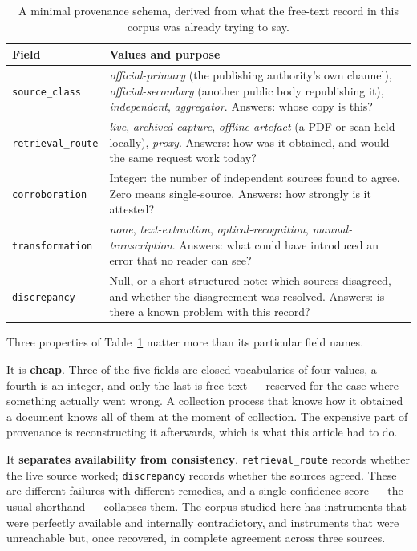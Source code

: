 \documentclass[11pt]{article}
\begin{document}
\begin{table}[t]
\centering
\small
\begin{tabular}{lp{7.4cm}}
\toprule
\textbf{Field} & \textbf{Values and purpose} \\
\midrule
\texttt{source\_class} & \emph{official-primary} (the publishing authority's
own channel), \emph{official-secondary} (another public body republishing it),
\emph{independent}, \emph{aggregator}. Answers: whose copy is this? \\
\addlinespace
\texttt{retrieval\_route} & \emph{live}, \emph{archived-capture},
\emph{offline-artefact} (a PDF or scan held locally), \emph{proxy}. Answers:
how was it obtained, and would the same request work today? \\
\addlinespace
\texttt{corroboration} & Integer: the number of independent sources found to
agree. Zero means single-source. Answers: how strongly is it attested? \\
\addlinespace
\texttt{transformation} & \emph{none}, \emph{text-extraction},
\emph{optical-recognition}, \emph{manual-transcription}. Answers: what could
have introduced an error that no reader can see? \\
\addlinespace
\texttt{discrepancy} & Null, or a short structured note: which sources
disagreed, and whether the disagreement was resolved. Answers: is there a known
problem with this record? \\
\bottomrule
\end{tabular}
\caption{A minimal provenance schema, derived from what the free-text record in
this corpus was already trying to say.}
\label{tab:schema}
\end{table}

Three properties of Table~\ref{tab:schema} matter more than its particular
field names.

It is \textbf{cheap}. Three of the five fields are closed vocabularies of
four values, a fourth is an integer, and only the last is free text --- reserved
for the case where something actually went wrong. A collection process that
knows how it obtained a document knows all of them at the moment of
collection. The expensive part of provenance
is reconstructing it afterwards, which is what this article had to do.

It \textbf{separates availability from consistency}. \texttt{retrieval\_route}
records whether the live source worked; \texttt{discrepancy} records whether the
sources agreed. These are different failures with different remedies, and a
single confidence score --- the usual shorthand --- collapses them. The corpus
studied here has instruments that were perfectly available and internally
contradictory, and instruments that were unreachable but, once recovered, in
complete agreement across three sources.
\end{document}
